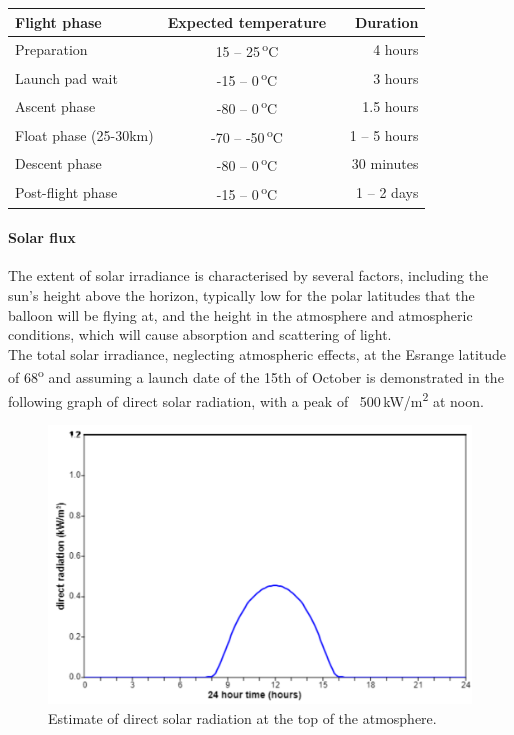 \begin{center}
  \begin{tabular}{ | l | c | r | }
    \hline
    \textbf{Flight phase} & \textbf{Expected temperature} & \textbf{Duration} \\ \hline
    Preparation  & 15 – 25\,\textsuperscript{o}C & 4 hours \\ \hline
    Launch pad wait & -15 – 0\,\textsuperscript{o}C & 3 hours \\ \hline
    Ascent phase  & -80 – 0\,\textsuperscript{o}C & 1.5 hours \\ \hline
    Float phase (25-30km) & -70 – -50\,\textsuperscript{o}C & 1 – 5 hours \\ \hline 
    Descent phase  & -80 – 0\,\textsuperscript{o}C & ~ 30 minutes \\ \hline
    Post-flight phase & -15 – 0\,\textsuperscript{o}C & 1 – 2 days \\ \hline
  \end{tabular}
\end{center}

\paragraph{Solar flux}

The extent of solar irradiance is characterised by several factors, including the sun’s height above the horizon, typically low for the polar latitudes that the balloon will be flying at, and the height in the atmosphere and atmospheric conditions, which will cause absorption and scattering of light. \\
The total solar irradiance, neglecting atmospheric effects, at the Esrange latitude of 68\textsuperscript{o} and assuming a launch date of the 15th of October is demonstrated in the following graph of direct solar radiation, with a peak of ~500\,kW/m\textsuperscript{2} at noon.\\

	\begin{figure}[h!]
    \centering
    \includegraphics[scale=0.6]{4-experiment-design/img/mechanical/directradiation.png}
	\caption{Estimate of direct solar radiation at the top of the atmosphere.}
	\label{fig:directradiation}
	\end{figure}

